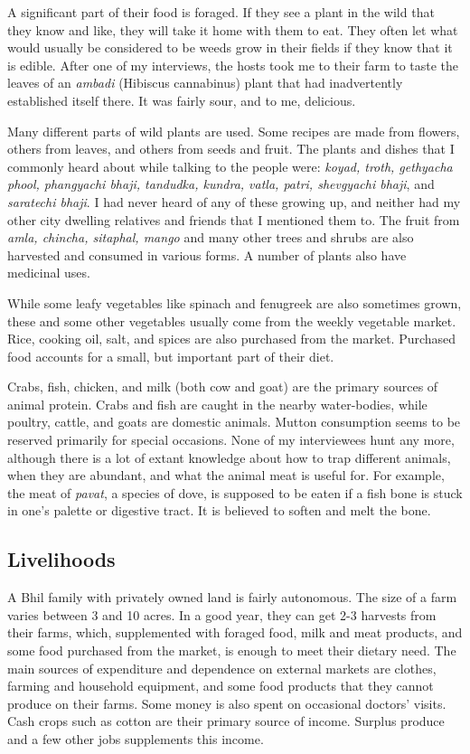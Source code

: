 \documentclass[report.tex]{subfiles}
\begin{document}
A significant part of their food is foraged. If they see a plant in the wild that they know and like, they will take it home with them to eat. They often let what would usually be considered to be weeds grow in their fields if they know that it is edible. After one of my interviews, the hosts took me to their farm to taste the leaves of an \textit{ambadi} (Hibiscus cannabinus) plant that had inadvertently established itself there. It was fairly sour, and to me, delicious.

Many different parts of wild plants are used. Some recipes are made from flowers, others from leaves, and others from seeds and fruit. The plants and dishes that I commonly heard about while talking to the people were: \textit{koyad, troth, gethyacha phool, phangyachi bhaji, tandudka, kundra, vatla, patri, shevgyachi bhaji}, and \textit{saratechi bhaji}. I had never heard of any of these growing up, and neither had my other city dwelling relatives and friends that I mentioned them to. The fruit from \textit{amla, chincha, sitaphal, mango} and many other trees and shrubs are also harvested and consumed in various forms. A number of plants also have medicinal uses.

While some leafy vegetables like spinach and fenugreek are also sometimes grown, these and some other vegetables usually come from the weekly vegetable market. Rice, cooking oil, salt, and spices are also purchased from the market. Purchased food accounts for a small, but important part of their diet.

Crabs, fish, chicken, and milk (both cow and goat) are the primary sources of animal protein. Crabs and fish are caught in the nearby water-bodies, while poultry, cattle, and goats are domestic animals. Mutton consumption seems to be reserved primarily for special occasions. None of my interviewees hunt any more, although there is a lot of extant knowledge about how to trap different animals, when they are abundant, and what the animal meat is useful for. For example, the meat of \textit{pavat}, a species of dove, is supposed to be eaten if a fish bone is stuck in one's palette or digestive tract. It is believed to soften and melt the bone.

\subsection{Livelihoods}

A Bhil family with privately owned land is fairly autonomous. The size of a farm varies between 3 and 10 acres. In a good year, they can get 2-3 harvests from their farms, which, supplemented with foraged food, milk and meat products, and some food purchased from the market, is enough to meet their dietary need. The main sources of expenditure and dependence on external markets are clothes, farming and household equipment, and some food products that they cannot produce on their farms. Some money is also spent on occasional doctors' visits. Cash crops such as cotton are their primary source of income. Surplus produce and a few other jobs supplements this income.
\end{document}
